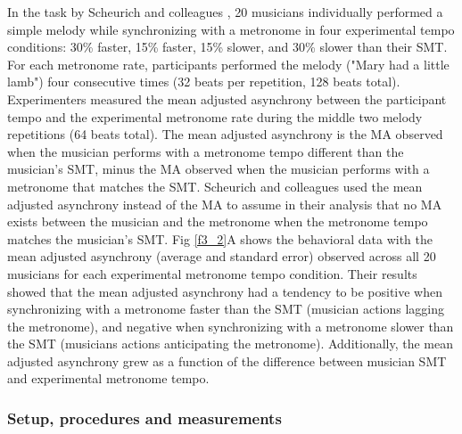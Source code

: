 \documentclass{report}
\begin{document}
In the task by Scheurich and colleagues \cite{scheurich2018tapping}, 20 musicians individually performed a simple melody while synchronizing with a metronome in four experimental tempo conditions: 30\% faster, 15\% faster, 15\% slower, and 30\% slower than their SMT. For each metronome rate, participants performed the melody ("Mary had a little lamb") four consecutive times (32 beats per repetition, 128 beats total). Experimenters measured the mean adjusted asynchrony between the participant tempo and the experimental metronome rate during the middle two melody repetitions (64 beats total). The mean adjusted asynchrony is the MA observed when the musician performs with a metronome tempo different than the musician's SMT, minus the MA observed when the musician performs with a metronome that matches the SMT. Scheurich and colleagues \cite{scheurich2018tapping} used the mean adjusted asynchrony instead of the MA to assume in their analysis that no MA exists between the musician and the metronome when the metronome tempo matches the musician's SMT. Fig \ref{f3_2}A shows the behavioral data with the mean adjusted asynchrony (average and standard error) observed across all 20 musicians for each experimental metronome tempo condition. Their results showed that the mean adjusted asynchrony had a tendency to be positive when synchronizing with a metronome faster than the SMT (musician actions lagging the metronome), and negative when synchronizing with a metronome slower than the SMT (musicians actions anticipating the metronome). Additionally, the mean adjusted asynchrony grew as a function of the difference between musician SMT and experimental metronome tempo.

\subsubsection{Setup, procedures and measurements} 
\end{document}
